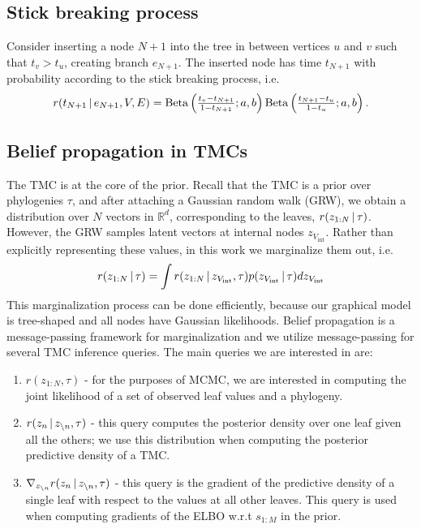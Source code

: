 \subsection{Stick breaking process}
\label{sec:stick-breaking}
Consider inserting a node $N + 1$ into the tree in between vertices $u$ and $v$
such that $t_v > t_u$,
creating branch $e_{N + 1}$.
The inserted node has time $t_{N + 1}$ with probability according to the stick breaking process, i.e.
\begin{equation}
\textstyle r(t_{N+1}\,|\, e_{N+1}, V, E) =
\mathrm{Beta}\left(\frac{t_v - t_{N + 1}}{1 - t_{N + 1}}; a, b\right)\mathrm{Beta}\left(\frac{t_{N + 1} - t_u}{1 - t_u}; a, b\right).
\end{equation}

\subsection{Belief propagation in TMCs}

The TMC is at the core of the \acronym\;
prior.
Recall that the TMC is
a prior over phylogenies $\tau$,
and after attaching a Gaussian random walk (GRW),
we obtain a distribution over $N$ vectors in $\mathbb{R}^d$,
corresponding to the leaves, $r(z_{1:N} \,|\, \tau)$.
However, the GRW samples
latent vectors at internal nodes $z_{V_{\text{int}}}$.
Rather than explicitly representing these values,
in this work we marginalize them out, i.e.
\begin{equation}
    r(z_{1:N} \,|\, \tau) = \int r(z_{1:N} \,|\, z_{V_{\text{int}}}, \tau)p(z_{V_{\text{int}}} \,|\, \tau) dz_{V_{\text{int}}}
\end{equation}
This marginalization process can be done efficiently, because our graphical model
is tree-shaped and all nodes have Gaussian likelihoods. Belief propagation is a message-passing
framework for marginalization and we utilize message-passing
for several TMC inference queries. The main queries we are interested in are:
\begin{enumerate}
    \item $r(z_{1:N}, \tau)$ - for the purposes of MCMC, we are interested in computing the joint likelihood of a set of observed
    leaf values and a phylogeny.
    \item $r(z_n \,|\, z_{\backslash n}, \tau)$ - this query computes the posterior density over one leaf given all the others;
    we use this distribution when computing the posterior predictive density of a TMC.
    \item $\nabla_{z_{\backslash n}} r(z_n \,|\, z_{\backslash n}, \tau)$ - this query is the gradient of the predictive density 
    of a single leaf with respect to the values at all other leaves. This query is used
    when computing gradients of the ELBO w.r.t $s_{1:M}$ in the \acronym\;prior.
\end{enumerate}

